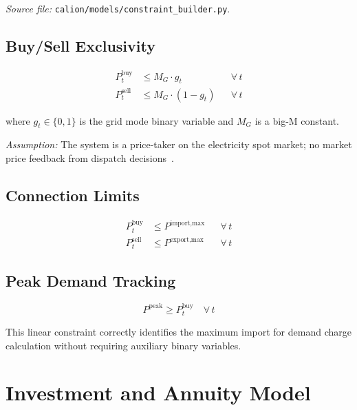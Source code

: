 \documentclass[a4paper,12pt]{article}
\begin{document}
\textit{Source file:} \texttt{calion/models/constraint\_builder.py}.

\subsection{Buy/Sell Exclusivity}

\begin{align}
  P^{\text{buy}}_{t}  &\leq M_{G} \cdot g_{t}         && \forall\, t \tag{EL-1} \label{eq:el1} \\
  P^{\text{sell}}_{t} &\leq M_{G} \cdot (1 - g_{t})   && \forall\, t \tag{EL-2} \label{eq:el2}
\end{align}

where $g_{t} \in \{0,1\}$ is the grid mode binary variable and $M_{G}$ is a big-M constant.

\noindent\textit{Assumption:} The system is a price-taker on the electricity spot market; no
market price feedback from dispatch decisions~\cite{Kirschen2018,Hirth2013}.

\subsection{Connection Limits}

\begin{align}
  P^{\text{buy}}_{t}  &\leq P^{\text{import,max}} && \forall\, t \tag{EL-3} \label{eq:el3} \\
  P^{\text{sell}}_{t} &\leq P^{\text{export,max}} && \forall\, t \tag{EL-4} \label{eq:el4}
\end{align}

\subsection{Peak Demand Tracking}

\begin{equation}
  P^{\text{peak}} \geq P^{\text{buy}}_{t} \quad \forall\, t
  \tag{EL-5}
  \label{eq:el5}
\end{equation}

This linear constraint correctly identifies the maximum import for demand charge calculation
without requiring auxiliary binary variables.

\section{Investment and Annuity Model}
\label{sec:investment}
\end{document}
